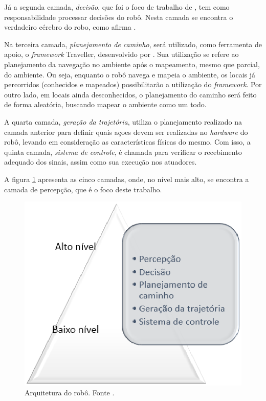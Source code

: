 Já a segunda camada, \textit{decisão}, que foi o foco de trabalho de \cite{tccCarol}, tem como responsabilidade processar decisões do robô. Nesta camada se encontra o verdadeiro cérebro do robo, como afirma \cite{vieira}.

Na terceira camada, \textit{planejamento de caminho}, será utilizado, como ferramenta de apoio, o \textit{framework} Traveller, desenvolvido por \cite{tccRodrigo}. Sua utilização se refere ao planejamento da navegação no ambiente após o mapeamento, mesmo que parcial, do ambiente. Ou seja, enquanto o robô navega e mapeia o ambiente, os locais já percorridos (conhecidos e mapeados) possibilitarão a utilização do \textit{framework}. Por outro lado, em locais ainda desconhecidos, o planejamento do caminho será feito de forma aleatória, buscando mapear o ambiente como um todo.

A quarta camada, \textit{geração da trajetória}, utiliza o planejamento realizado na camada anterior para definir quais açoes devem ser realizadas no \textit{hardware} do robô, levando em consideração as características físicas do mesmo. Com isso, a quinta camada, \textit{sistema de controle}, é chamada para verificar o recebimento adequado dos sinais, assim como sua execução nos atuadores.

A figura \ref{img:camadas} apresenta as cinco camadas, onde, no nível mais alto, se encontra a camada de percepção, que é o foco deste trabalho.

\begin{figure}[H]
	\centering
	\includegraphics[scale=0.6]{figuras/camadas.eps}
	\caption[Arquitetura do robô]{Arquitetura do robô. Fonte \cite{vieira}.}
	\label{img:camadas}
\end{figure}

